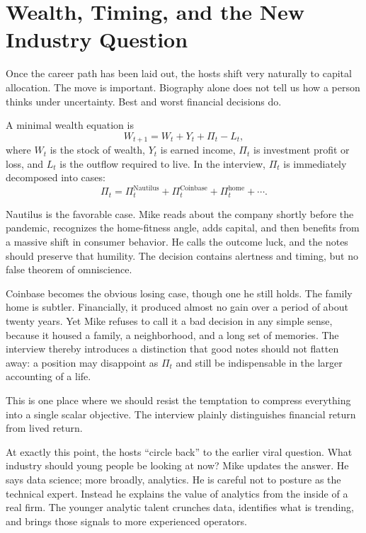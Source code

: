 \section{Wealth, Timing, and the New Industry Question}

Once the career path has been laid out, the hosts shift very naturally to capital allocation. The move is important. Biography alone does not tell us how a person thinks under uncertainty. Best and worst financial decisions do.

A minimal wealth equation is
\begin{equation}
W_{t+1}=W_t+Y_t+\Pi_t-L_t,
\end{equation}
where \(W_t\) is the stock of wealth, \(Y_t\) is earned income, \(\Pi_t\) is investment profit or loss, and \(L_t\) is the outflow required to live. In the interview, \(\Pi_t\) is immediately decomposed into cases:
\begin{equation}
\Pi_t=\Pi_t^{\text{Nautilus}}+\Pi_t^{\text{Coinbase}}+\Pi_t^{\text{home}}+\cdots.
\end{equation}

Nautilus is the favorable case. Mike reads about the company shortly before the pandemic, recognizes the home-fitness angle, adds capital, and then benefits from a massive shift in consumer behavior. He calls the outcome luck, and the notes should preserve that humility. The decision contains alertness and timing, but no false theorem of omniscience.

Coinbase becomes the obvious losing case, though one he still holds. The family home is subtler. Financially, it produced almost no gain over a period of about twenty years. Yet Mike refuses to call it a bad decision in any simple sense, because it housed a family, a neighborhood, and a long set of memories. The interview thereby introduces a distinction that good notes should not flatten away: a position may disappoint as \(\Pi_t\) and still be indispensable in the larger accounting of a life.

\begin{remark}
This is one place where we should resist the temptation to compress everything into a single scalar objective. The interview plainly distinguishes financial return from lived return.
\end{remark}

At exactly this point, the hosts ``circle back'' to the earlier viral question. What industry should young people be looking at now? Mike updates the answer. He says data science; more broadly, analytics. He is careful not to posture as the technical expert. Instead he explains the value of analytics from the inside of a real firm. The younger analytic talent crunches data, identifies what is trending, and brings those signals to more experienced operators.

